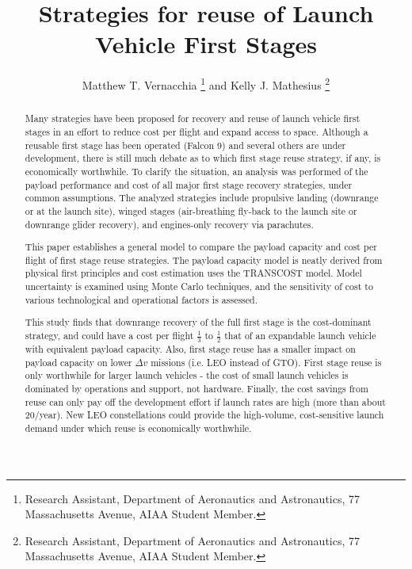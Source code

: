 \documentclass[conf]{new-aiaa}
\title{Strategies for reuse of Launch Vehicle First Stages}
\author{Matthew T. Vernacchia \footnote{Research Assistant, Department of Aeronautics and Astronautics, 77 Massachusetts Avenue, AIAA Student Member.}
and Kelly J. Mathesius  \footnote{Research Assistant, Department of Aeronautics and Astronautics, 77 Massachusetts Avenue, AIAA Student Member.}}
\affil{Massachusetts Institute of Technology, Cambridge, MA, 02139}
\begin{document}
\maketitle

\begin{abstract}
Many strategies have been proposed for recovery and reuse of launch vehicle first stages in an effort to reduce cost per flight and expand access to space. Although a reusable first stage has been operated (Falcon 9) and several others are under development, there is still much debate as to which first stage reuse strategy, if any, is economically worthwhile. To clarify the situation, an analysis was performed of the payload performance and cost of all major first stage recovery strategies, under common assumptions. The analyzed strategies include propulsive landing (downrange or at the launch site), winged stages (air-breathing fly-back to the launch site or downrange glider recovery), and engines-only recovery via parachutes.

This paper establishes a general model to compare the payload capacity and cost per flight of first stage reuse strategies. The payload capacity model is neatly derived from physical first principles and cost estimation uses the TRANSCOST model. Model uncertainty is examined using Monte Carlo techniques, and the sensitivity of cost to various technological and operational factors is assessed.

This study finds that downrange recovery of the full first stage is the cost-dominant strategy, and could have a cost per flight $\frac{1}{3}$ to $\frac{1}{2}$ that of an expandable launch vehicle with equivalent payload capacity. Also, first stage reuse has a smaller impact on payload capacity on lower $\Delta v$ missions (i.e. LEO instead of GTO).  First stage reuse is only worthwhile for larger launch vehicles - the cost of small launch vehicles is dominated by operations and support, not hardware. Finally, the cost savings from reuse can only pay off the development effort if launch rates are high (more than about 20/year). New LEO constellations could provide the high-volume, cost-sensitive launch demand under which reuse is economically worthwhile.
\end{abstract}
\end{document}
